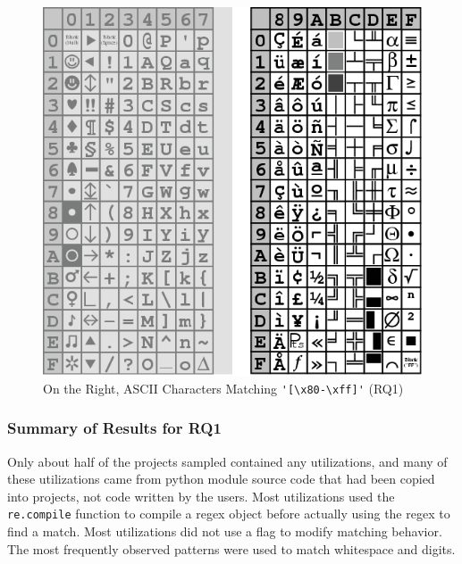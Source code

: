 
\begin{figure}[tb]
\centering
\includegraphics[width=\columnwidth]{../illustrations/ASCIItable.eps}
\cprotect\caption{On the Right, ASCII Characters Matching \verb!'[\x80-\xff]'! (RQ1)}
\label{fig:ASCIItable}
\end{figure}





% 


\subsubsection{Summary of Results for RQ1}
Only about half of the projects sampled contained any utilizations, and many of these utilizations came from python module source code that had been copied into projects, not code written by the users.  Most utilizations used the {\tt re.compile} function to compile a regex object before actually using the regex to find a match.  Most utilizations did not use a flag to modify matching behavior.  The most frequently observed patterns were used to match whitespace and digits.

